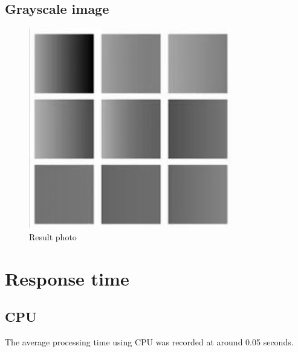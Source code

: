 \documentclass{article}
\begin{document}
\subsection{Grayscale image}
\begin{figure}[htbp]
    \centering
    \includegraphics{grayscale.png}
    \caption{Result photo}
    \label{fig:placeholder}
\end{figure}

\section{Response time}
\subsection{CPU}
The average processing time using CPU was recorded at around 0.05 seconds.
\end{document}
